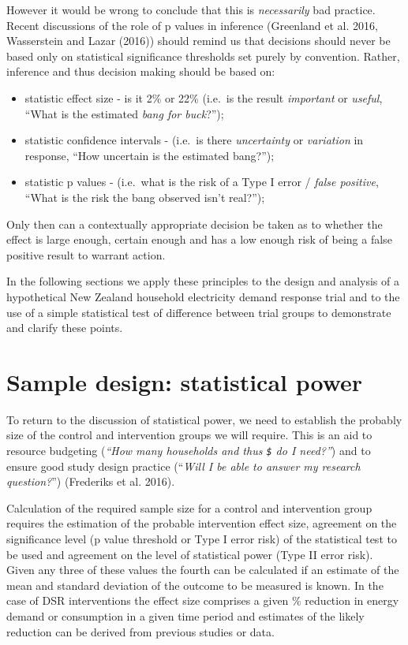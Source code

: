 \documentclass[]{article}
\providecommand{\tightlist}{%
  \setlength{\itemsep}{0pt}\setlength{\parskip}{0pt}}
\theoremstyle{definition}
\theoremstyle{definition}
\theoremstyle{definition}
\theoremstyle{remark}
\begin{document}
However it would be wrong to conclude that this is \emph{necessarily}
bad practice. Recent discussions of the role of p values in inference
(Greenland et al. 2016, Wasserstein and Lazar (2016)) should remind us
that decisions should never be based only on statistical significance
thresholds set purely by convention. Rather, inference and thus decision
making should be based on:

\begin{itemize}
\tightlist
\item
  statistic effect size - is it 2\% or 22\% (i.e.~is the result
  \emph{important} or \emph{useful}, ``What is the estimated \emph{bang
  for buck}?'');
\item
  statistic confidence intervals - (i.e.~is there \emph{uncertainty} or
  \emph{variation} in response, ``How uncertain is the estimated
  bang?'');
\item
  statistic p values - (i.e.~what is the risk of a Type I error /
  \emph{false positive}, ``What is the risk the bang observed isn't
  real?'');
\end{itemize}

Only then can a contextually appropriate decision be taken as to whether
the effect is large enough, certain enough and has a low enough risk of
being a false positive result to warrant action.

In the following sections we apply these principles to the design and
analysis of a hypothetical New Zealand household electricity demand
response trial and to the use of a simple statistical test of difference
between trial groups to demonstrate and clarify these points.

\section{Sample design: statistical
power}\label{sample-design-statistical-power}

To return to the discussion of statistical power, we need to establish
the probably size of the control and intervention groups we will
require. This is an aid to resource budgeting (\emph{``How many
households and thus \texttt{\$} do I need?''}) and to ensure good study
design practice (``\emph{Will I be able to answer my research
question?}'') (Frederiks et al. 2016).

Calculation of the required sample size for a control and intervention
group requires the estimation of the probable intervention effect size,
agreement on the significance level (p value threshold or Type I error
risk) of the statistical test to be used and agreement on the level of
statistical power (Type II error risk). Given any three of these values
the fourth can be calculated if an estimate of the mean and standard
deviation of the outcome to be measured is known. In the case of DSR
interventions the effect size comprises a given \% reduction in energy
demand or consumption in a given time period and estimates of the likely
reduction can be derived from previous studies or data.
\end{document}
